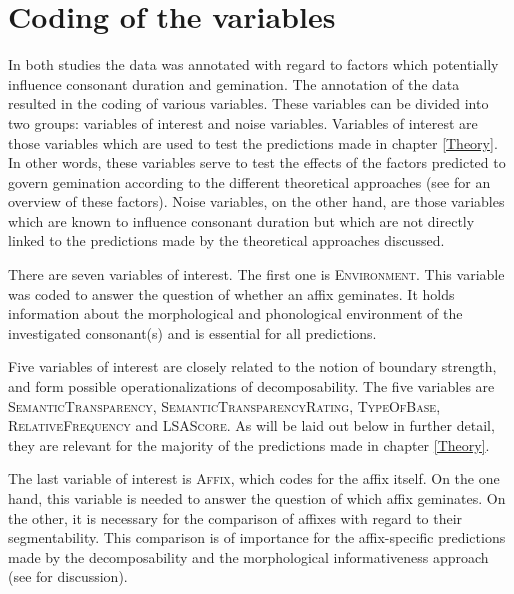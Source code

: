 \section{Coding of the variables} \label{General method annotation}



In both studies the data was annotated with regard to factors which potentially influence consonant duration and gemination. The annotation of the data resulted in the coding of various variables.
 These variables can be divided into two groups: variables of interest and noise variables. Variables of interest are those variables which are used to test the predictions made in chapter \ref{Theory}. In other words, these variables serve to test the effects of the factors predicted to govern gemination according to the different theoretical approaches (see  for an overview of these factors).
Noise variables, on the other hand, are those variables which are known to influence consonant duration but which are not directly linked to the predictions made by the theoretical approaches discussed.

There are seven variables of interest. The first one is \textsc{Environment}. This variable was coded to answer the question of whether an affix geminates. It holds information about the morphological and phonological environment of the investigated consonant(s) and is essential for all predictions.


Five variables of interest are closely related to the notion of boundary strength,  and form possible operationalizations of decomposability. The five variables are \textsc{SemanticTransparency}, \textsc{SemanticTransparencyRating}, \textsc{TypeOfBase}, \textsc{RelativeFrequency} and \textsc{LSAScore}. As will be laid out below in further detail, they are relevant for the majority of the predictions made in chapter \ref{Theory}. 


The last variable of interest is \textsc{Affix}, which codes for the affix itself. On the one hand, this variable is needed to answer the question of which affix geminates. On the other, it is necessary for the comparison of affixes with regard to their segmentability. This comparison is of importance for the affix-specific predictions made by the decomposability and the morphological informativeness approach (see  for discussion). 


